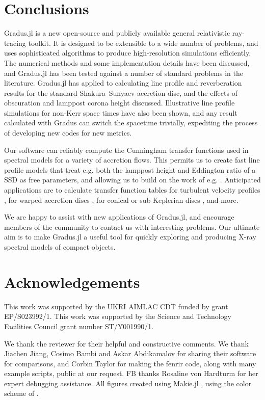\documentclass[fleqn,usenatbib]{mnras}
\newcommand{\software}[1]{{\sc #1}}
\newcommand{\Gradus}{\software{Gradus.jl}\xspace}
\begin{document}
\section{Conclusions}
\label{sec:conclusion}

\Gradus is a new open-source and publicly available general relativistic
ray-tracing toolkit. It is designed to be extensible to a wide number of
problems, and uses sophisticated algorithms to produce high-resolution
simulations efficiently. The numerical methods and some implementation details
have been discussed, and \Gradus has been tested against a number of standard
problems in the literature. \Gradus has applied to calculating line profile and
reverberation results for the standard Shakura--Sunyaev accretion disc, and the
effects of obscuration and lamppost corona height discussed. Illustrative line
profile simulations for non-Kerr space times have also been shown, and any
result calculated with Gradus can switch the spacetime trivially, expediting
the process of developing new codes for new metrics.

Our software can reliably compute the Cunningham transfer functions used in
spectral models for a variety of accretion flows. This permits us to create fast
line profile models that treat e.g. both the lamppost height and Eddington ratio
of a SSD as free parameters, and allowing us to build on the work of e.g.
\citet{jiang_black_20222}. Anticipated applications are to calculate transfer
function tables for turbulent velocity profiles \citep{pariev_line_1998}, for
warped accretion discs \citep[e.g.][]{hartnoll_reprocessed_2001}, for conical or
sub-Keplerian discs \citep[e.g.][]{wu_iron_2007}, and more.

We are happy to assist with new applications of \Gradus, and encourage members
of the community to contact us with interesting problems. Our ultimate aim is to
make \Gradus a useful tool for quickly exploring and producing X-ray spectral
models of compact objects.

\section*{Acknowledgements}
This work was supported by the UKRI AIMLAC CDT funded by grant EP/S023992/1. This
work was supported by the Science and Technology Facilities Council grant number
ST/Y001990/1.

We thank the reviewer for their helpful and constructive comments. We thank
Jiachen Jiang, Cosimo Bambi and Askar Abdikamalov for sharing their software for
comparisons, and Corbin Taylor for making the \software{fenrir} code, along with
many example scripts, public at our request. FB thanks Rosaline von Hardturm for
her expert debugging assistance. All figures created using Makie.jl
\citep{DanischKrumbiegel2021}, using the color scheme of
\citet{wong_points_2011}.
\end{document}

